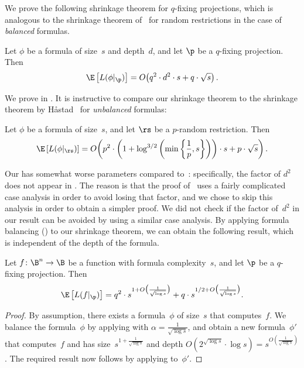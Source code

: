 \noindent We prove the following shrinkage theorem for $q$-fixing
projections, which is analogous to the shrinkage theorem of~\cite{H98}
for random restrictions in the case of \emph{balanced} formulas. 
\begin{theorem}
\label{thm:shrinkage-fixing}Let $\phi$ be a formula of size~$s$ and
depth~$d$, and let $\p$ be a $q$-fixing projection. Then 
\[
\E\left[L(\phi|_{\p})\right]=O\!\left(q^{2}\cdot d^{2}\cdot s+q\cdot\sqrt{s}\right).
\]
\end{theorem}

\noindent We prove  in .
It is instructive to compare our shrinkage theorem to the shrinkage
theorem by H{\aa}stad~\cite{H98} for \emph{unbalanced} formulas:
\begin{theorem}[\cite{H98}]
\label{thm:shrinkage-hastad}Let $\phi$ be a formula of size~$s$,
and let $\rs$ be a $p$-random restriction. Then
\[
\E\left[L(\phi|_{\rs})\right]=O\!\left(p^{2}\cdot\left(1+\log^{3/2}\left(\min\left\{ \frac{1}{p},s\right\} \right)\right)\cdot s+p\cdot\sqrt{s}\right).
\]
\end{theorem}

Our  has somewhat worse parameters compared
to~: specifically, the factor of $d^{2}$
does not appear in . The reason is that the
proof of~\cite{H98} uses a fairly complicated case analysis in order
to avoid losing that factor, and we chose to skip this analysis in
order to obtain a simpler proof. We did not check if the factor of~$d^{2}$
in our result can be avoided by using a similar case analysis. By
applying formula balancing () to our shrinkage
theorem, we can obtain the following result, which is independent
of the depth of the formula. 
\begin{corollary}
\label{cor:shrinkage-without-depth-fixing}Let $f\colon\B^{n}\to\B$ be
a function with formula complexity~$s$, and let $\p$ be a $q$-fixing
projection. Then 
\[
\E\left[L(f|_{\p})\right]=q^{2}\cdot s^{1+O\bigl(\frac{1}{\sqrt{\log s}}\bigr)}+q\cdot s^{1/2+O\bigl(\frac{1}{\sqrt{\log s}}\bigr)}.
\]
\end{corollary}

\begin{proof}
By assumption, there exists a formula~$\phi$ of size~$s$ that
computes~$f$. We balance the formula~$\phi$ by applying 
with $\alpha=\frac{1}{\sqrt{\log s}}$, and obtain a new formula~$\phi'$
that computes~$f$ and has size~$s^{1+\frac{1}{\sqrt{\log s}}}$
and depth $O(2^{\sqrt{\log s}}\cdot\log s)=s^{O(\frac{1}{\sqrt{\log s}})}$.
The required result now follows by applying 
to~$\phi'$.
\end{proof}

